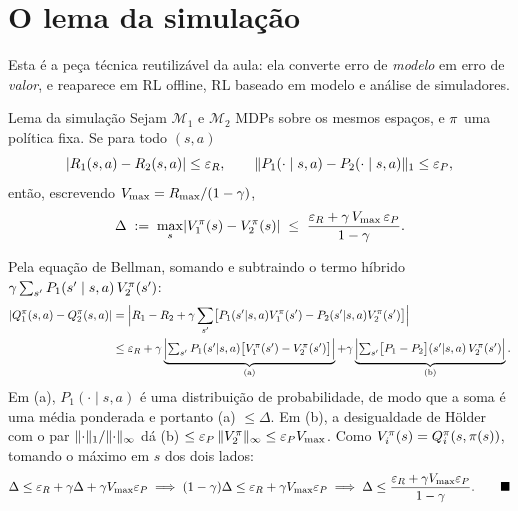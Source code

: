 \documentclass[11pt, a4paper]{article}
\newcommand{\Vmax}{V_{\max}}
\newcommand{\Mdp}{\mathcal{M}}
\begin{document}
\section{O lema da simulação}

Esta é a peça técnica reutilizável da aula: ela converte erro de \emph{modelo} em erro de
\emph{valor}, e reaparece em RL offline, RL baseado em modelo e análise de simuladores.

\begin{teobox}{Lema da simulação}
Sejam $\Mdp_1$ e $\Mdp_2$ MDPs sobre os mesmos espaços, e $\pi$ uma política fixa. Se
para todo $(s,a)$
\[
  \lvert R_1(s,a) - R_2(s,a)\rvert \le \varepsilon_{R},
  \qquad
  \lVert P_1(\cdot\mid s,a) - P_2(\cdot\mid s,a)\rVert_1 \le \varepsilon_{P},
\]
então, escrevendo $\Vmax = \rec_{\max}/(1-\gamma)$,
\[
  \Delta \;:=\; \max_{s}\abs{V_1^{\pol}(s) - V_2^{\pol}(s)}
  \;\le\; \frac{\varepsilon_{\rec} + \gamma\,\Vmax\,\varepsilon_{P}}{1-\gamma}.
\]
\end{teobox}

\begin{provabox}
Pela equação de Bellman, somando e subtraindo o termo híbrido
$\gamma\sum_{s'} P_1(s'\mid s,a)\,V_2^{\pi}(s')$:
\begin{align*}
  \lvert Q_1^{\pi}(s,a) - Q_2^{\pi}(s,a)\rvert
  &= \Bigl| R_1 - R_2
     + \gamma \sum_{s'}\bigl[P_1(s'|s,a)V_1^{\pi}(s') - P_2(s'|s,a)V_2^{\pi}(s')\bigr]\Bigr| \\
  &\le \varepsilon_{R}
     + \gamma \underbrace{\Bigl|\textstyle\sum_{s'} P_1(s'|s,a)\bigl[V_1^{\pi}(s') - V_2^{\pi}(s')\bigr]\Bigr|}_{\text{(a)}}
     + \gamma \underbrace{\Bigl|\textstyle\sum_{s'}\bigl[P_1 - P_2\bigr](s'|s,a)\,V_2^{\pi}(s')\Bigr|}_{\text{(b)}} .
\end{align*}
Em (a), $P_1(\cdot\mid s,a)$ é uma distribuição de probabilidade, de modo que a soma é uma
média ponderada e portanto (a) $\le \Delta$. Em (b), a desigualdade de Hölder com o par
$\lVert\cdot\rVert_1 / \lVert\cdot\rVert_{\infty}$ dá
(b) $\le \varepsilon_P\,\norminf{V_2^{\pol}} \le \varepsilon_P \Vmax$. Como
$V_i^{\pi}(s) = Q_i^{\pi}(s,\pi(s))$, tomando o máximo em $s$ dos dois lados:
\[
  \Delta \le \varepsilon_{\rec} + \gamma\Delta + \gamma\Vmax\varepsilon_P
  \;\Longrightarrow\;
  (1-\gamma)\Delta \le \varepsilon_{\rec} + \gamma\Vmax\varepsilon_P
  \;\Longrightarrow\;
  \Delta \le \frac{\varepsilon_{\rec} + \gamma\Vmax\varepsilon_P}{1-\gamma}. \qquad \blacksquare
\]
\end{provabox}
\end{document}

